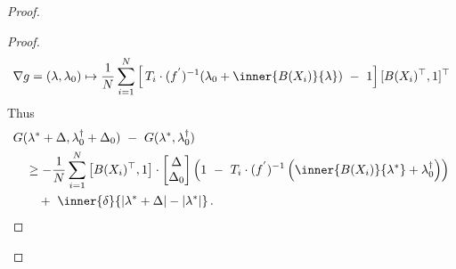 \begin{proof}
\begin{proof}
  \begin{gather}
    \nabla
    g
    =
    (\lambda,\lambda_0)
    \mapsto
\frac{1}{N}
\sum_{i=1} 
  ^N
  \left[ 
    \,
  T_i
  \cdot
  (f^{'})^{-1}
  \!
  \left( 
\lambda_0
+
\inner
{B(X_i)}
{\lambda}
  \right)
  \ 
-
\ 
1
  \right]
  [
  B(X_i)^\top
  ,
  1
  ]^\top
  \end{gather}
  Thus
\begin{align}
  \label{c:1}
  \begin{split}
     &
   G
     (
     \lambda^*
      +
      \Delta
      ,
      \lambda^\dagger_0
      +
     \Delta_0
     )
     \ 
     -
     \ 
     G
     (
     \lambda^*,
      \lambda^\dagger_0
     )
     \\
     &
     \quad
     \ge
     -
     \frac{1}{N}
     \sum_{i=1}^{N} 
     \left[ 
       B(X_i)^\top,
       1
     \right]
     \cdot
     \begin{bmatrix}
       \Delta\\
       \Delta_0
     \end{bmatrix}
     \left( 
       1
       \ 
       -
       \ 
     T_i
     \cdot
     (f^{'})^{-1}
     \left( 
       \inner
       {B(X_i)}
       {\lambda^*}
       +
      \lambda^\dagger_0
     \right)
     \right)
     \\
     &
     \qquad
     +
     \ 
     \inner
     {\delta}
     {
       |\lambda^*+\Delta|
       -
       |\lambda^*|
     }
     \,.
   \end{split}
\end{align}

 \end{proof}
\end{proof}

